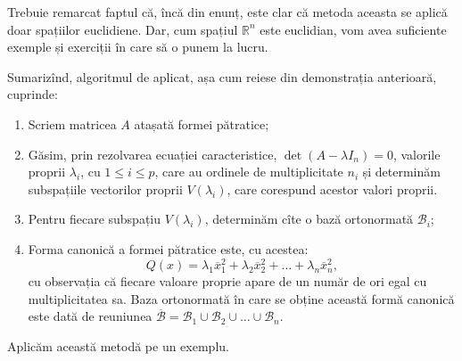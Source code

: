 \documentclass[11pt,a4paper]{article}
\theoremstyle{dotless}
\theoremstyle{dotlessdr}
\begin{document}
Trebuie remarcat faptul că, încă din enunț, este clar că metoda aceasta se 
aplică doar spațiilor euclidiene. Dar, cum spațiul $\mathbb{R}^n$ este 
euclidian, vom avea suficiente exemple și exerciții în care să o punem la lucru.

Sumarizînd, algoritmul de aplicat, așa cum reiese din demonstrația anterioară,
cuprinde:
\begin{enumerate}[(1)]
	\item Scriem matricea $A$ atașată formei pătratice;
	\item Găsim, prin rezolvarea ecuației caracteristice,
$\det(A - \lambda I_n) = 0$, valorile proprii $\lambda_i$, cu $1 \leq i \leq p$,
care au ordinele de multiplicitate $n_i$ și determinăm subspațiile vectorilor
proprii $V(\lambda_i)$, care corespund acestor valori proprii.
    \item Pentru fiecare subspațiu $V(\lambda_i)$, determinăm cîte o bază
ortonormată $\mathcal{B}_i$;
    \item Forma canonică a formei pătratice este, cu acestea: 
 \[
	Q(x) = \lambda_1 \overline{x}_1^2 + \lambda_2 \overline{x}_2^2 + \dots
	         + \lambda_n \overline{x}_n^2,
\]
cu observația că fiecare valoare proprie apare de un număr de ori egal cu
multiplicitatea sa. Baza ortonormată în care se obține această formă canonică
este dată de reuniunea $\overline{\mathcal{B}} = \mathcal{B}_1 \cup 
\mathcal{B}_2 \cup \dots \cup \mathcal{B}_n$.
\end{enumerate}

Aplicăm această metodă pe un exemplu.
\end{document}
